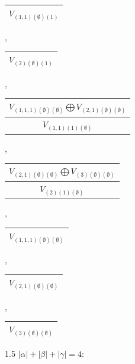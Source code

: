 \documentclass[letterpaper,11pt]{article}
\begin{document}
	\begin{tabular}{| c |}
		\hline
		$V_{(1,1)(\emptyset)(1)}$\\
		\hline
	\end{tabular}, 
	\begin{tabular}{| c |}
		\hline
		$V_{(2)(\emptyset)(1)}$\\
		\hline
	\end{tabular}, 
	\begin{tabular}{| c |}
		\hline
		$V_{(1,1,1)(\emptyset)(\emptyset)}$$\bigoplus$$V_{(2,1)(\emptyset)(\emptyset)}$\\
		\hline
		$V_{(1,1)(1)(\emptyset)}$\\
		\hline
	\end{tabular}, 
	\begin{tabular}{| c |}
		\hline
		$V_{(2,1)(\emptyset)(\emptyset)}$$\bigoplus$$V_{(3)(\emptyset)(\emptyset)}$\\
		\hline
		$V_{(2)(1)(\emptyset)}$\\
		\hline
	\end{tabular}, 
	\begin{tabular}{| c |}
		\hline
		$V_{(1,1,1)(\emptyset)(\emptyset)}$\\
		\hline
	\end{tabular}, 
	\begin{tabular}{| c |}
		\hline
		$V_{(2,1)(\emptyset)(\emptyset)}$\\
		\hline
	\end{tabular}, 
	\begin{tabular}{| c |}
		\hline
		$V_{(3)(\emptyset)(\emptyset)}$\\
		\hline
	\end{tabular}

	\begin{spacing}{1.5}
		$|\alpha| + |\beta| + |\gamma|=4$:
	\end{spacing}
\end{document}
